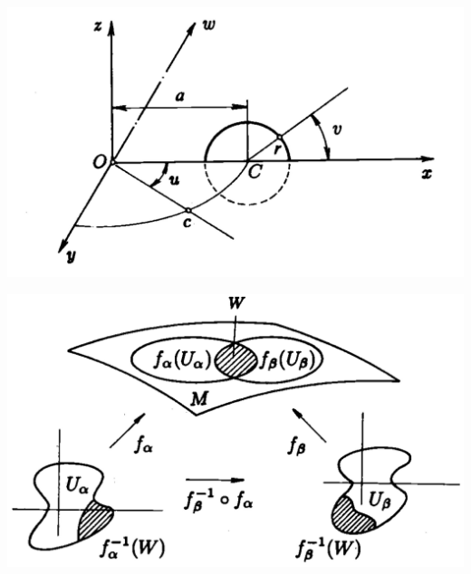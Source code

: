 \documentclass[../main.tex]{subfiles}
\begin{document}
\begin{marginfigure}[50mm]
	\includegraphics[width=1\linewidth]{images/klein_bottle.jpg}
	\caption[Picture from Do Carmo]{}
\end{marginfigure} 
\begin{marginfigure}[70mm]
	\includegraphics[width=1\linewidth]{images/n-diff-manifold-do-carmo.jpg}
	\caption[Picture from Do Carmo]{}
\end{marginfigure}
\end{document}

